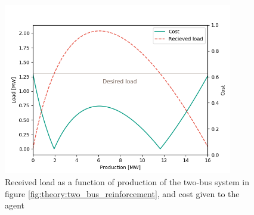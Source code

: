 \documentclass[class=book, crop=false, 11pt]{standalone}
\begin{document}
\begin{figure}[h]
    \center
    \includegraphics[height=7.5cm, width=10cm]{figures/twobus_load_balance.png}
    \caption  {Received load as a function of production of the two-bus system in figure \ref{fig:theory:two_bus_reinforcement}, and cost given to the agent}
    \label{fig:theory:two_bus_failing}
\end{figure}
\end{document}
